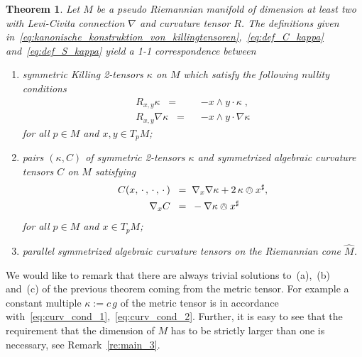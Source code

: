 \documentclass[11pt,a4paper]{article}
\theoremstyle{plain}
\newtheorem{theorem}{Theorem}
\theoremstyle{remark}
\begin{document}
\bigskip
\begin{theorem}\label{th:main_1}
Let $M$ be a pseudo Riemannian manifold of dimension at least two with Levi-Civita
connection $\nabla$ and curvature tensor $R$. The definitions given in~\eqref{eq:kanonische_konstruktion_von_killingtensoren},~\eqref{eq:def_C_kappa} and~\eqref{eq:def_S_kappa} yield a 1-1 correspondence between 
\begin{enumerate}
\item symmetric Killing 2-tensors $\kappa$ on $M$ which satisfy the following nullity conditions
\begin{align}\label{eq:curv_cond_1}
R_{x,y}\kappa\;\;=\;\;& - x\wedge y \cdot \kappa\;,\\
\label{eq:curv_cond_2}
R_{x,y} \nabla \kappa\;\;=\;\;& - x\wedge y\cdot \nabla \kappa
\end{align}
for all $p\in M$ and $x,y\in T_pM$;
\item pairs $(\kappa,C)$ of symmetric 2-tensors $\kappa$ and symmetrized algebraic curvature tensors $C$ on $M$ satisfying
\begin{align}\label{eq:alg_curv_tensor_1}
C(x,\,\cdot\,,\,\cdot\,,\,\cdot\,)\;\;=\;\;& \nabla_x\nabla\kappa + 2\,\kappa\owedge x^\sharp,\\
\label{eq:alg_curv_tensor_2}
\nabla_x C \;\;=\;\;& - \nabla\kappa\owedge x^\sharp
\end{align}
for all $p\in M$ and $x \in T_pM$;
\item parallel symmetrized algebraic curvature tensors on the Riemannian cone $\hat M$.
\end{enumerate}
\end{theorem}

We would like to remark that there are always trivial solutions to~(a),~(b) and~(c) of the previous theorem coming from the metric tensor. 
For example a constant multiple $\kappa := c\, g$ of the metric tensor is in accordance with~\eqref{eq:curv_cond_1},~\eqref{eq:curv_cond_2}. Further, it is easy to see that the requirement that the dimension of $M$ 
has to be strictly larger than one is necessary, see Remark~\ref{re:main_3}.
\end{document}
